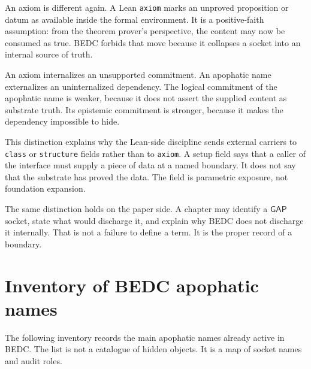 An axiom is different again. A Lean \texttt{axiom} marks an unproved proposition or datum as available inside the formal environment. It is a positive-faith assumption: from the theorem prover's perspective, the content may now be consumed as true. BEDC forbids that move because it collapses a socket into an internal source of truth.

\begin{principle}
\label{prin:apophatic-naming-externalized-not-assumed}
An axiom internalizes an unsupported commitment. An apophatic name externalizes an uninternalized dependency. The logical commitment of the apophatic name is weaker, because it does not assert the supplied content as substrate truth. Its epistemic commitment is stronger, because it makes the dependency impossible to hide.
\end{principle}

This distinction explains why the Lean-side discipline sends external carriers to \texttt{class} or \texttt{structure} fields rather than to \texttt{axiom}. A setup field says that a caller of the interface must supply a piece of data at a named boundary. It does not say that the substrate has proved the data. The field is parametric exposure, not foundation expansion.

The same distinction holds on the paper side. A chapter may identify a $\mathsf{GAP}$ socket, state what would discharge it, and explain why BEDC does not discharge it internally. That is not a failure to define a term. It is the proper record of a boundary.


\section{Inventory of BEDC apophatic names}
\label{sec:apophatic-naming-inventory}

The following inventory records the main apophatic names already active in BEDC. The list is not a catalogue of hidden objects. It is a map of socket names and audit roles.

